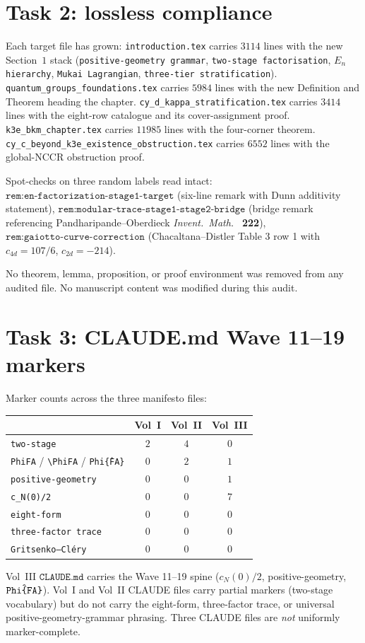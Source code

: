 \documentclass[11pt]{article}
\providecommand{\PhiFA}{\Phi^{\mathrm{FA}}}
\begin{document}
\section{Task 2: lossless compliance}

Each target file has grown: \texttt{introduction.tex} carries $3114$
lines with the new Section~$1$ stack
(\texttt{positive-geometry grammar}, \texttt{two-stage factorisation},
\texttt{$E_n$ hierarchy}, \texttt{Mukai Lagrangian},
\texttt{three-tier stratification}). \texttt{quantum\_groups\_foundations.tex}
carries $5984$ lines with the new Definition and Theorem heading the
chapter. \texttt{cy\_d\_kappa\_stratification.tex} carries $3414$
lines with the eight-row catalogue and its cover-assignment proof.
\texttt{k3e\_bkm\_chapter.tex} carries $11985$ lines with the
four-corner theorem. \texttt{cy\_c\_beyond\_k3e\_existence\_obstruction.tex}
carries $6552$ lines with the global-NCCR obstruction proof.

Spot-checks on three random labels read intact:
$\texttt{rem:en-factorization-stage1-target}$ (six-line remark with
Dunn additivity statement),
$\texttt{rem:modular-trace-stage1-stage2-bridge}$ (bridge remark
referencing Pandharipande--Oberdieck \emph{Invent.\ Math.\ } \textbf{222}),
$\texttt{rem:gaiotto-curve-correction}$ (Chacaltana--Distler Table 3
row 1 with $c_{4d} = 107/6$, $c_{2d} = -214$).

No theorem, lemma, proposition, or proof environment was removed
from any audited file. No manuscript content was modified during
this audit.

\section{Task 3: CLAUDE.md Wave 11--19 markers}

Marker counts across the three manifesto files:
\begin{center}
\begin{tabular}{lccc}
 & Vol~I & Vol~II & Vol~III \\ \hline
\texttt{two-stage}        & $2$ & $4$ & $0$ \\
\texttt{PhiFA} / \verb|\PhiFA| / \texttt{Phi\^\{FA\}} & $0$ & $2$ & $1$ \\
\texttt{positive-geometry} & $0$ & $0$ & $1$ \\
\texttt{c\_N(0)/2}        & $0$ & $0$ & $7$ \\
\texttt{eight-form}       & $0$ & $0$ & $0$ \\
\texttt{three-factor trace} & $0$ & $0$ & $0$ \\
\texttt{Gritsenko--Cl\'ery} & $0$ & $0$ & $0$ \\
\end{tabular}
\end{center}
Vol~III $\texttt{CLAUDE.md}$ carries the Wave 11--19 spine
($c_N(0)/2$, positive-geometry, $\texttt{Phi\^\{FA\}}$). Vol~I and
Vol~II CLAUDE files carry partial markers (two-stage vocabulary)
but do not carry the eight-form, three-factor trace, or universal
positive-geometry-grammar phrasing. Three CLAUDE files are \emph{not}
uniformly marker-complete.
\end{document}
